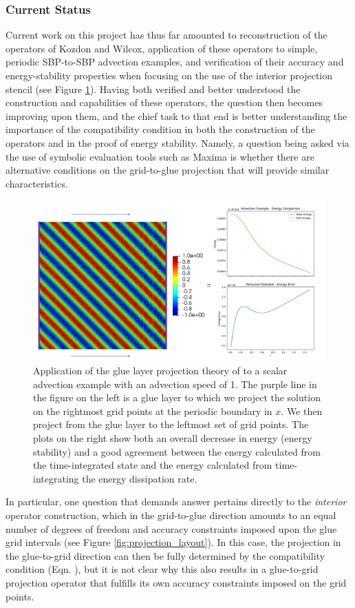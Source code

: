 \subsubsection{Current Status}

Current work on this project has thus far amounted to reconstruction of the
operators of Kozdon and Wilcox, application of these operators to simple, periodic
SBP-to-SBP advection examples, and verification of their accuracy and energy-stability
properties when focusing on the use of the interior projection stencil (see Figure \ref{fig:advection_projection}).
Having both verified and better understood the construction and capabilities of these operators,
the question then becomes improving upon them, and the chief task to that end is
better understanding the importance of the compatibility condition in both the
construction of the operators and in the proof of energy stability. Namely,
a question being asked via the use of symbolic evaluation tools such as Maxima \cite{li2008maxima}
is whether there are alternative conditions on the grid-to-glue projection that
will provide similar characteristics.
\begin{figure}
\centering
\includegraphics[width=0.9\linewidth,trim=4 4 4 4,clip]{figures/advection_projection.png}
\caption{Application of the glue layer projection theory of \cite{kozdon2016stable} to a
	 scalar advection example with an advection speed of 1. The purple line in the figure
	 on the left is a glue layer to which we project the solution on the rightmost grid points
	 at the periodic boundary in $x$. We then project from the glue layer to the leftmost set
	 of grid points. The plots on the right show both an overall decrease in energy (energy stability)
	 and a good agreement between the energy calculated from the time-integrated state and the energy
	 calculated from time-integrating the energy dissipation rate.}
\label{fig:advection_projection}
\end{figure}
In particular, one question that demands answer pertains directly to the
\emph{interior} operator construction, which in the grid-to-glue direction
amounts to an equal number of degrees of freedom and accuracy constraints
imposed upon the glue grid intervals (see Figure \ref{fig:projection_layout}). In
this case, the projection in the glue-to-grid direction can then be fully
determined by the compatibility condition (Eqn. ), but
it is not clear why this also results in a glue-to-grid projection operator
that fulfills its own accuracy constraints imposed on the grid points.

